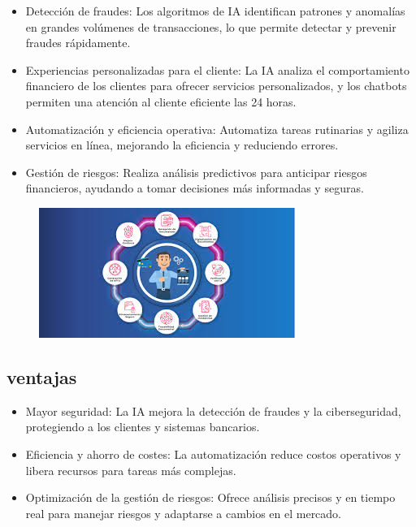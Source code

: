 \documentclass[12pt]{article}
\begin{document}
\begin{itemize}
    \item Detección de fraudes: 
    Los algoritmos de IA identifican patrones y anomalías en grandes volúmenes de transacciones, 
    lo que permite detectar y prevenir fraudes rápidamente.
    \item Experiencias personalizadas para el cliente: 
    La IA analiza el comportamiento financiero de los clientes para ofrecer servicios personalizados, 
    y los chatbots permiten una atención al cliente eficiente las 24 horas.
    \item Automatización y eficiencia operativa: Automatiza tareas rutinarias y agiliza servicios en línea, 
    mejorando la eficiencia y reduciendo errores.
    \item Gestión de riesgos: Realiza análisis predictivos para anticipar riesgos financieros, 
    ayudando a tomar decisiones más informadas y seguras.
\end{itemize}

\begin{figure}[h!]
    \centering
    \includegraphics[width=.6\textwidth]{banca.png}
    \label{fig:my_label}
\end{figure}

\subsection{ventajas}

\begin{itemize}
    \item Mayor seguridad: 
    La IA mejora la detección de fraudes y la ciberseguridad, protegiendo a los clientes y sistemas bancarios.
    \item Eficiencia y ahorro de costes: 
    La automatización reduce costos operativos y libera recursos para tareas más complejas.
    \item Optimización de la gestión de riesgos: 
    Ofrece análisis precisos y en tiempo real para manejar riesgos y adaptarse a cambios en el mercado.
\end{itemize}
\end{document}
